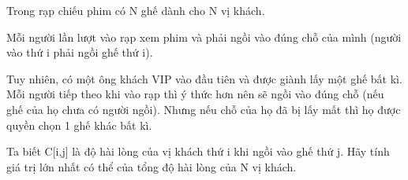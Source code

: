 Trong rạp chiếu phim có N ghế dành cho N vị khách.  

   Mỗi người lần lượt vào rạp xem phim và phải ngồi vào đúng chỗ của mình (người vào thứ i phải ngồi ghế thứ i).  

   Tuy nhiên, có một ông khách VIP vào đầu tiên và được giành lấy một ghế bất kì. Mỗi người tiếp theo khi vào rạp thì ý thức hơn nên sẽ ngồi vào đúng chỗ (nếu ghế của họ chưa có người ngồi). Nhưng nếu chỗ của họ đã bị lấy mất thì họ được quyền chọn 1 ghế khác bất kì.  

   Ta biết C[i,j] là độ hài lòng của vị khách thứ i khi ngồi vào ghế thứ j. Hãy tính giá trị lớn nhất có thể của tổng độ hài lòng của N vị khách.  

\
